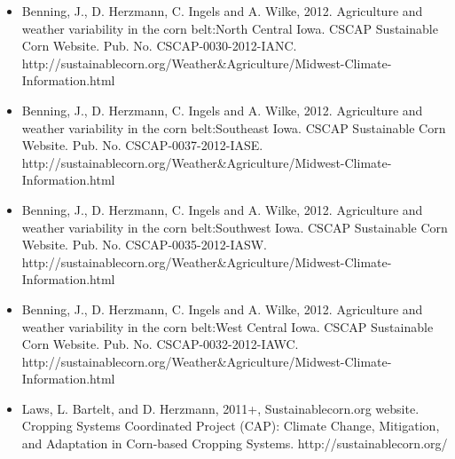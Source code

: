 \begin{itemize}
\item Benning, J., D. Herzmann, C. Ingels and A. Wilke, 2012. Agriculture and weather variability in the corn belt:North Central Iowa. CSCAP Sustainable Corn Website. Pub. No. CSCAP-0030-2012-IANC. http://sustainablecorn.org/Weather\&Agriculture/Midwest-Climate-Information.html

\item Benning, J., D. Herzmann, C. Ingels and A. Wilke, 2012. Agriculture and weather variability in the corn belt:Southeast Iowa. CSCAP Sustainable Corn Website. Pub. No. CSCAP-0037-2012-IASE. http://sustainablecorn.org/Weather\&Agriculture/Midwest-Climate-Information.html

\item Benning, J., D. Herzmann, C. Ingels and A. Wilke, 2012. Agriculture and weather variability in the corn belt:Southwest Iowa. CSCAP Sustainable Corn Website. Pub. No. CSCAP-0035-2012-IASW. http://sustainablecorn.org/Weather\&Agriculture/Midwest-Climate-Information.html

\item Benning, J., D. Herzmann, C. Ingels and A. Wilke, 2012. Agriculture and weather variability in the corn belt:West Central Iowa. CSCAP Sustainable Corn Website. Pub. No. CSCAP-0032-2012-IAWC. http://sustainablecorn.org/Weather\&Agriculture/Midwest-Climate-Information.html
\item Laws, L. Bartelt, and D. Herzmann, 2011+, Sustainablecorn.org website. Cropping Systems Coordinated Project (CAP): Climate Change, Mitigation, and Adaptation in Corn-based Cropping Systems. http://sustainablecorn.org/
\end{itemize}

